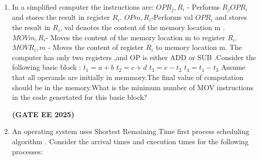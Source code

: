 \documentclass[journal,12pt,onecolumn]{IEEEtran}
\theoremstyle{remark}
\begin{document}
\begin {center}
\begin{enumerate}
\begin{enumerate}
\begin{multicols}{2}
       \end{multicols}
    \end{enumerate}
    \hfill \textbf{(GATE EE 2025)}
    \item In a simplified computer  the instructions are:
    \newline 
    $OPR_j,R_i$ - Performs $R_jOPR_i$ and stores the result in register $R_i$.
    \newline
    $OPm,R_i$-Performs val $OPR_i$ and stores the result in $R_i$, val denotes the content of the memory location m .
    \newline
    $MOV m,R_i$- Moves the content of the memory location m to register $R_i$.
    \newline 
    $MOV R_i,m$ - Moves the content of register $R_i$ to memory location m.
    \newline
    The computer has only two registers ,and OP is either ADD or SUB .Consider the following basic block :
    \newline
     $t_1 =a+b $
     \newline 
     $t_2= c+d$
     \newline 
     $t_3=e-t_2$
     \newline
     $t_4=t_1-t_3$
     \newline 
     Assume that all operands are initially in memmory.The final value of computation should  be in the memory.What is the minimum number of MOV instructions in the code genertated for this basic block?
     \begin{enumerate}
     \end{enumerate}
     \hfill \textbf{(GATE EE 2025)}
     \item An operating system uses Shortest Remaining Time first  process scheduling algorithm . Consider the arrival times and execution times for the following processes:
     \newline
     \begin{tabular}{c c c}
          
     
     

\end{tabular}
\end{enumerate}
\end{center}
\end{document}
